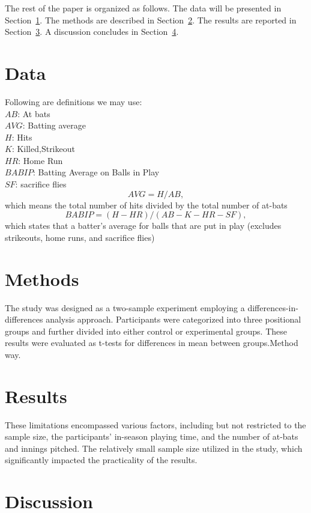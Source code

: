 \documentclass[12pt]{article}
\begin{document}
The rest of the paper is organized as follows.
The data will be presented in Section~\ref{sec:data}.
The methods are described in Section~\ref{sec:meth}.
The results are reported in Section~\ref{sec:resu}.
A discussion concludes in Section~\ref{sec:disc}.


\section{Data}
\label{sec:data}
Following are definitions we may use:\\
$AB$: At bats\\ 
$AVG$: Batting average\\ 
$H$: Hits\\
$K$: Killed,Strikeout \\
$HR$: Home Run\\
$BABIP$: Batting Average on Balls in Play\\
$SF$: sacrifice flies\\
\begin{equation}
  \label{eq:AVG}
  AVG = H/AB,
\end{equation}
which means the total number of hits divided by the total number of at-bats
\begin{equation}
  \label{eq:BABIP}
  BABIP = (H - HR) / (AB - K - HR - SF),
\end{equation}
which states that a batter's average for balls that are put in play (excludes strikeouts, home runs, and sacrifice flies)


\section{Methods}
\label{sec:meth}
The study was designed as a two-sample experiment employing a differences-in-differences analysis approach.
Participants were categorized into three positional groups and further divided into either control or experimental groups. 
These results were evaluated as t-tests for differences in mean between groups.Method way\citep[e.g.,][]{Dalmass2018baseball}.



\section{Results}
\label{sec:resu}
These limitations encompassed various factors, including but not restricted to the sample size, the participants' in-season playing time,
and the number of at-bats and innings pitched. The relatively small sample size utilized in the study, which significantly impacted the practicality of the results.


\section{Discussion}
\label{sec:disc}




\end{document}
